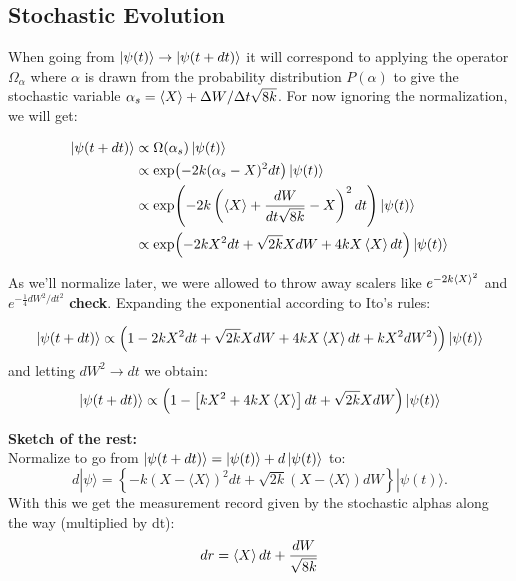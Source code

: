 \subsection{Stochastic Evolution}
When going from $\ket{\psi(t)} \to \ket{\psi(t + dt)}$ it will correspond to applying the operator $\Omega_\alpha$ where $\alpha$ is drawn from the probability distribution $P(\alpha)$ to give the stochastic variable $\alpha_s =\expval{X} + {\Delta W}/{\Delta t \sqrt{8k}}$. For now ignoring the normalization, we will get:
\begin{fullwidth}
\begin{align}
    \ket{\psi(t + dt)}  &\propto \Omega(\alpha_s)\ket{\psi(t)} \\
                        &\propto \exp(-2k (\alpha_s - X)^2 dt ) \ket{\psi(t)} \\
                        &\propto \exp(-2k \left({\expval{X} + \frac{dW}{dt \sqrt{8k}}}  - X\right)^2 dt ) \ket{\psi(t)} \\
                        &\propto \exp(-2k X^2 dt + \sqrt{2k} X dW + 4 k X \expval{X} dt) \ket{\psi(t)}
\end{align}
\end{fullwidth}
As we'll normalize later, we were allowed to throw away scalers like $e^{-2k\expval{X}^2}$ and $e^{-\frac{1}{4}dW^2 / dt^2}$ \textbf{check}. Expanding the exponential according to Ito's rules:
\begin{fullwidth}
\begin{equation}
\ket{\psi(t + dt)} \propto    \left( 1 -2k X^2 dt + \sqrt{2k} X dW + 4 k X \expval{X} dt + k X^2 dW^2) \right)\ket{\psi(t)} 
\end{equation}
and letting $dW^2 \to dt$ we obtain:
\begin{equation}
\ket{\psi(t + dt)} \propto    \left( 1 - \left[k X^2 + 4 k X \expval{X} \right]dt + \sqrt{2k} X dW \right)\ket{\psi(t)}     
\end{equation}
\end{fullwidth}
\textbf{Sketch of the rest:} \\ 
\noindent
Normalize to go from $\ket{\psi(t + dt)} = \ket{\psi(t)} + d\ket{\psi(t)}$ to:
\begin{equation}
d|\psi\rangle=\left\{-k(X-\langle X\rangle)^2 d t+\sqrt{2 k}(X-\langle X\rangle) d W\right\}|\psi(t)\rangle .
\end{equation}
With this we get the measurement record given by the stochastic alphas along the way (multiplied by dt):
\begin{align}
    dr = \expval{X}dt + \frac{dW}{\sqrt{8k}}
\end{align}

